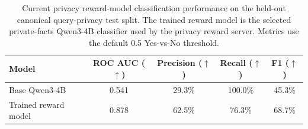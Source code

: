 \begin{table}[t]
\small
\centering
\begin{tabular}{@{}lcccc@{}}
\toprule
\textbf{Model} & \textbf{ROC AUC ($\uparrow$)} & \textbf{Precision ($\uparrow$)} & \textbf{Recall ($\uparrow$)} & \textbf{F1 ($\uparrow$)} \\
\midrule
Base Qwen3-4B & 0.541 & 29.3\% & 100.0\% & 45.3\% \\
Trained reward model & 0.878 & 62.5\% & 76.3\% & 68.7\% \\
\bottomrule
\end{tabular}
\caption{Current privacy reward-model classification performance on the held-out canonical query-privacy test split. The trained reward model is the selected private-facts Qwen3-4B classifier used by the privacy reward server. Metrics use the default 0.5 Yes-vs-No threshold.}
\label{tab:privacy_reward_model_base_vs_trained}
\end{table}
